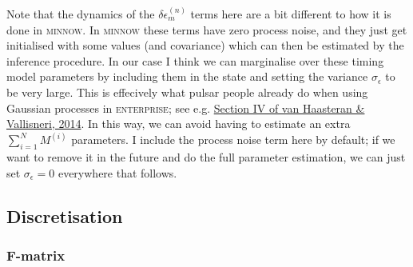 \documentclass[]{scrartcl}
\begin{document}
\noindent Note that the dynamics of the $\delta \epsilon^{(n)}_{m}$ terms here are a bit different to how it is done in \textsc{minnow}. In \textsc{minnow} these terms have zero process noise, and they just get initialised with some values (and covariance) which can then be estimated by the inference procedure. In our case I think we can marginalise over these timing model parameters by including them in the state and setting the variance $\sigma_\epsilon$ to be very large. This is effecively what pulsar people already do when using Gaussian processes in \textsc{enterprise}; see e.g. \href{https://arxiv.org/abs/1407.1838}{Section IV of van Haasteran \& Vallisneri, 2014}. In this way, we can avoid having to estimate an extra $\sum_{i=1}^{N} M^{(i)}$ parameters. I include the process noise term here by default; if we want to remove it in the future and do the full parameter estimation, we can just set $\sigma_\epsilon=0$ everywhere that follows.




\subsection{Discretisation}

\subsubsection{F-matrix}
	
\end{document}
